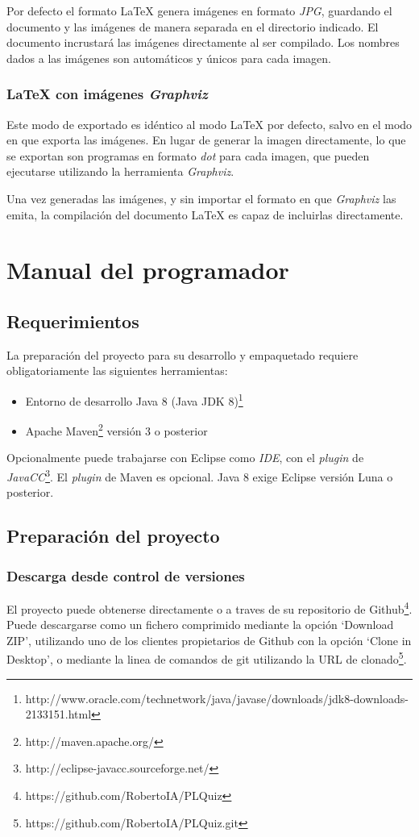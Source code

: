 Por defecto el formato \LaTeX{} genera imágenes en formato \emph{JPG}, guardando el documento y las imágenes de manera separada en el directorio indicado.
El documento incrustará las imágenes directamente al ser compilado.
Los nombres dados a las imágenes son automáticos y únicos para cada imagen.

\subsubsection{\LaTeX{} con imágenes \emph{Graphviz}}
Este modo de exportado es idéntico al modo \LaTeX{} por defecto, salvo en el modo en que exporta las imágenes.
En lugar de generar la imagen directamente, lo que se exportan son programas en formato \emph{dot} para cada imagen, que pueden ejecutarse utilizando la herramienta \emph{Graphviz}.

Una vez generadas las imágenes, y sin importar el formato en que \emph{Graphviz} las emita, la compilación del documento \LaTeX{} es capaz de incluirlas directamente.

\section{Manual del programador}

\subsection{Requerimientos}
La preparación del proyecto para su desarrollo y empaquetado requiere obligatoriamente las siguientes herramientas:
\begin{itemize}
	\item Entorno de desarrollo Java 8 (Java JDK 8)\footnote{http://www.oracle.com/technetwork/java/javase/downloads/jdk8-downloads-2133151.html}
	\item Apache Maven\footnote{http://maven.apache.org/} versión 3 o posterior
\end{itemize}

Opcionalmente puede trabajarse con Eclipse como \emph{IDE}, con el \emph{plugin} de \emph{JavaCC}\footnote{http://eclipse-javacc.sourceforge.net/}.
El \emph{plugin} de Maven es opcional.
Java 8 exige Eclipse versión Luna o posterior.

\subsection{Preparación del proyecto}
\subsubsection{Descarga desde control de versiones}
El proyecto puede obtenerse directamente o a traves de su repositorio de Github\footnote{https://github.com/RobertoIA/PLQuiz}. Puede descargarse como un fichero comprimido mediante la opción `Download ZIP', utilizando uno de los clientes propietarios de Github con la opción `Clone in Desktop', o mediante la linea de comandos de git utilizando la URL de clonado\footnote{https://github.com/RobertoIA/PLQuiz.git}.

